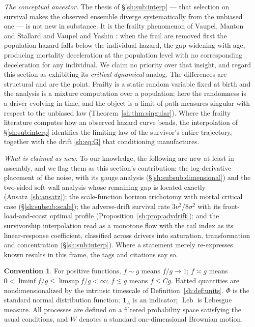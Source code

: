 \documentclass[11pt]{article}
\numberwithin{equation}{section}
\theoremstyle{plain}
\theoremstyle{definition}
\newtheorem{convention}[theorem]{Convention}
\theoremstyle{remark}
\DeclareMathOperator{\Leb}{Leb}
\newcommand{\one}{\mathbf{1}}
\begin{document}
\emph{The conceptual ancestor.} The thesis of \S\ref{sh:sub:interp} ---
that selection on survival makes the observed ensemble diverge
systematically from the unbiased one --- is not new in substance. It is
the frailty phenomenon of Vaupel, Manton and Stallard \cite{VMS79} and
Vaupel and Yashin \cite{VY85}: when the frail are removed first the
population hazard falls below the individual hazard, the gap widening
with age, producing mortality deceleration at the population level with
no corresponding deceleration for any individual. We claim no priority
over that insight, and regard this section as exhibiting its
\emph{critical dynamical} analog. The differences are structural and
are the point. Frailty is a static random variable fixed at birth and the
analysis is a mixture computation over a population; here the randomness
is a driver evolving in time, and the object is a limit of path measures
singular with respect to the unbiased law
(Theorem~\ref{sh:thm:singular}). Where the frailty literature computes
how an observed hazard curve bends, the interpolation of
\S\ref{sh:sub:interp} identifies the limiting law of the survivor's
entire trajectory, together with the drift \eqref{sh:eq:G} that
conditioning manufactures.

\emph{What is claimed as new.} To our knowledge, the following are new
at least in assembly, and we flag them as this section's contribution:
the log-derivative placement of the noise, with its gauge analysis
(\S\ref{sh:subsub:dimensional}) and the two-sided soft-wall analysis
whose remaining gap is located exactly (Ansatz~\ref{sh:ansatz}); the
scale-function horizon trichotomy with mortal critical case
(\S\ref{sh:subsub:scale}); the adverse-drift survival rate
$3\nu^2/8\sigma^2$ with its front-load-and-coast optimal profile
(Proposition~\ref{sh:prop:advdrift}); and the survivorship
interpolation read as a monotone flow with the tail index as its
linear-response coefficient, classified across drivers into saturation,
transformation and concentration (\S\ref{sh:sub:interp}). Where a
statement merely re-expresses known results in this frame, the tags and
citations say so.

\begin{convention}\label{sh:conv}
For positive functions, $f\sim g$ means $f/g\to1$; $f\asymp g$ means
$0<\liminf f/g\le\limsup f/g<\infty$; $f\lesssim g$ means $f\le Cg$.
Hatted quantities are nondimensionalized by the intrinsic timescale of
Definition~\ref{sh:def:units}. $\Phi$ is the standard normal distribution
function; $\one_A$ is an indicator; $\Leb$ is Lebesgue measure. All processes
are defined on a filtered probability space satisfying the usual conditions,
and $W$ denotes a standard one-dimensional Brownian motion.
\end{convention}
\end{document}
